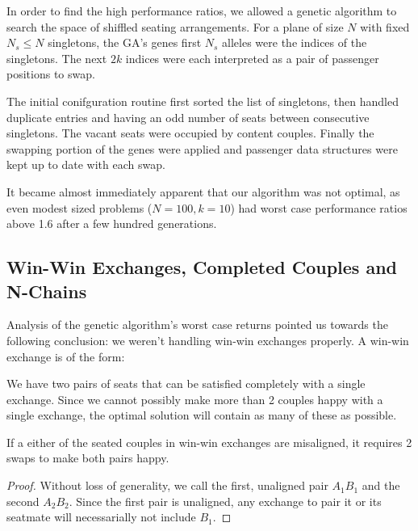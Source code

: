 \documentclass[11pt,twocolumn]{article}
\begin{document}
In order to find the high performance ratios, we allowed a genetic algorithm to search the space of shiffled seating arrangements.  For a plane of size $N$ with fixed $N_s \leq N$ singletons, the GA's genes first $N_s$ alleles were the indices of the singletons.  The next $2k$ indices were each interpreted as a pair of passenger positions to swap.  

The initial conifguration routine first sorted the list of singletons, then handled duplicate entries and having an odd number of seats between consecutive singletons. The vacant seats were occupied by content couples.  Finally the swapping portion of the genes were applied and passenger data structures were kept up to date with each swap.

It became almost immediately apparent that our algorithm was not optimal, as even modest sized problems ($N = 100, k = 10$) had worst case performance ratios above 1.6 after a few hundred generations.

\subsection{Win-Win Exchanges, Completed Couples and N-Chains}

Analysis of the genetic algorithm's worst case returns pointed us towards the following conclusion: we weren't handling win-win exchanges properly.  A win-win exchange is of the form:

\begin{figure}[H]
\centering
{}
\end{figure}

We have two pairs of seats that can be satisfied completely with a single exchange. Since we cannot possibly make more than 2 couples happy with a single exchange, the optimal solution will contain as many of these as possible.  

\begin{lem} 
If a either of the seated couples in win-win exchanges are misaligned, it requires 2 swaps to make both pairs happy.
\end{lem}

\begin{proof}
Without loss of generality, we call the first, unaligned pair $A_1B_1$ and the second $A_2B_2$.  Since the first pair is unaligned, any exchange to pair it or its seatmate will necessarially not include $B_1$.  
\end{proof}
\end{document}

